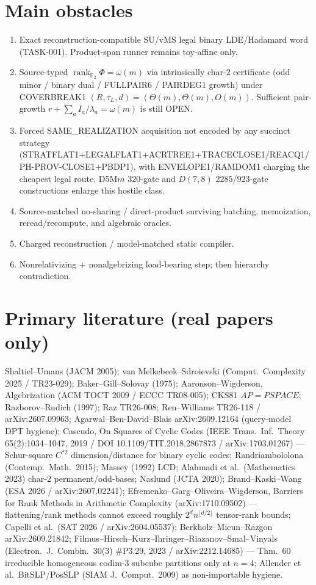 \documentclass[11pt]{article}
\begin{document}
\section*{Main obstacles}
\begin{enumerate}
\item Exact reconstruction-compatible SU/vMS legal binary LDE/Hadamard word
(TASK-001). Product-span runner remains toy-affine only.
\item Source-typed $\operatorname{rank}_{\mathbb F_2}\Phi=\omega(m)$ via
intrinsically char-$2$ certificate (odd minor / binary dual / FULLPAIR6 /
PAIRDEG1 growth) under COVERBREAK1
$(R,\tau_L,d)=(\Theta(m),\Theta(m),O(m))$. Sufficient pair-growth
$r+\sum_a I_a/\lambda_a=\omega(m)$ is still OPEN.
\item Forced SAME\_REALIZATION acquisition not encoded by any succinct strategy
(STRATFLAT1+LEGALFLAT1+ACRTREE1+TRACECLOSE1/REACQ1/PH-PROV-CLOSE1+PBDP1), with
ENVELOPE1/RAMDOM1 charging the cheapest legal route. D5M$m$ $320$-gate and
$D(7,8)$ $2285$/$923$-gate constructions enlarge this hostile class.
\item Source-matched no-sharing / direct-product surviving batching, memoization,
reread/recompute, and algebraic oracles.
\item Charged reconstruction / model-matched static compiler.
\item Nonrelativizing + nonalgebrizing load-bearing step; then hierarchy
contradiction.
\end{enumerate}

\section*{Primary literature (real papers only)}
Shaltiel--Umans (JACM 2005); van Melkebeek--Sdroievski (Comput.\ Complexity 2025 /
TR23-029); Baker--Gill--Solovay (1975); Aaronson--Wigderson, Algebrization
(ACM TOCT 2009 / ECCC TR08-005); CKS81 $AP=PSPACE$; Razborov--Rudich (1997);
Raz TR26-008; Ren--Williams TR26-118 / arXiv:2607.09963;
Agarwal--Ben-David--Blais arXiv:2609.12164 (query-model DPT hygiene);
Cascudo, On Squares of Cyclic Codes (IEEE Trans.\ Inf.\ Theory 65(2):1034--1047,
2019 / DOI 10.1109/TIT.2018.2867873 / arXiv:1703.01267) --- Schur-square
$C^{*2}$ dimension/distance for binary cyclic codes;
Randriambololona (Contemp.\ Math.\ 2015); Massey (1992) LCD;
Alahmadi et al.\ (Mathematics 2023) char-$2$ permanent/odd-bases;
Naslund (JCTA 2020); Brand--Kaski--Wang (ESA 2026 / arXiv:2607.02241);
Efremenko--Garg--Oliveira--Wigderson, Barriers for Rank Methods in Arithmetic
Complexity (arXiv:1710.09502) --- flattening/rank methods cannot exceed roughly
$2^d n^{\lfloor d/2\rfloor}$ tensor-rank bounds;
Capelli et al.\ (SAT 2026 / arXiv:2604.05537); Berkholz--Micun--Razgon
arXiv:2609.21842; Filmus--Hirsch--Kurz--Ihringer--Riazanov--Smal--Vinyals
(Electron.\ J.\ Combin.\ 30(3) \#P3.29, 2023 / arXiv:2212.14685) --- Thm.~60
irreducible homogeneous codim-3 subcube partitions only at $n=4$;
Allender et al.\ BitSLP/PosSLP (SIAM J.\ Comput.\ 2009) as non-importable hygiene.
\end{document}
